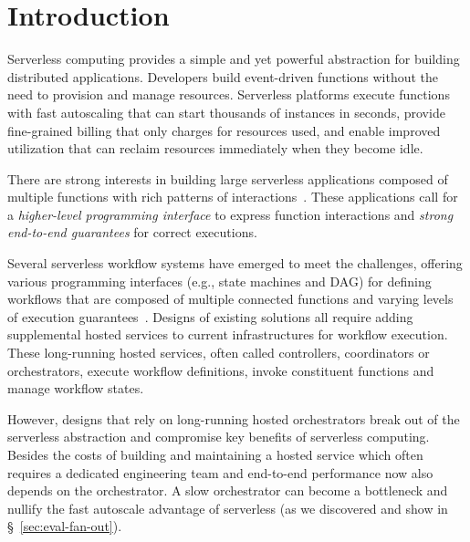\section{Introduction}

Serverless computing provides a simple and yet powerful abstraction for
building distributed applications.  Developers build event-driven functions
without the need to provision and manage resources. Serverless platforms
execute functions with fast autoscaling that can start thousands of instances
in seconds, provide fine-grained billing that only charges for resources used, and
enable improved utilization that can reclaim resources immediately when they become
idle.

There are strong interests in building large serverless applications composed
of multiple functions with rich patterns of interactions~\cite{excamera,
pywren, gg-atc, beldi, boki}.  These applications call for a
\emph{higher-level programming interface} to express function interactions and
\emph{strong end-to-end guarantees} for correct executions.

Several serverless workflow systems have emerged to meet the challenges,
offering various programming interfaces (e.g., state machines and DAG) for
defining workflows that are composed of multiple connected functions and
varying levels of execution guarantees~\cite{excamera, gg-atc,
aws-step-functions, google-cloud-composer, google-workflows,
durable-functions}. Designs of existing solutions all require adding
supplemental hosted services to current infrastructures for workflow
execution. These long-running hosted services, often called controllers,
coordinators or orchestrators, execute workflow definitions, invoke
constituent functions and manage workflow states.


However, designs that rely on long-running hosted orchestrators break out of
the serverless abstraction and compromise key benefits of serverless
computing. Besides the costs of building and maintaining a hosted service
which often requires a dedicated engineering team and end-to-end performance now
also depends on the orchestrator. A slow orchestrator can become a
bottleneck and nullify the fast autoscale advantage of serverless (as we
discovered and show in \S~\ref{sec:eval-fan-out}).

